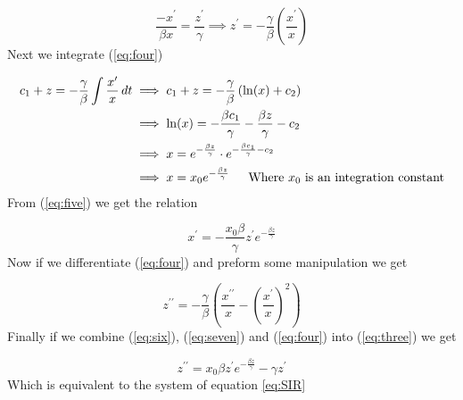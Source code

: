 \begin{equation} \label{eq:four}
	\frac{-x^{\prime}}{\beta x} = \frac{z^{\prime}}{\gamma}
	\implies z^{\prime} = -\frac{\gamma}{\beta}\left(\frac{x^{\prime}}{x}\right)
\end{equation}
\newpage Next we integrate (\ref{eq:four}) 


\begin{equation} \label{eq:five}
	\begin{split}
		c_{1} + z = -\frac{\gamma}{\beta} \int \frac{x^{\prime}}{x} \,dt
		 & \implies c_{1} + z = -\frac{\gamma}{\beta}\left(\ln(x) + c_{2}\right)                                       \\
		 & \implies \ln(x) = -\frac{\beta c_{1}}{\gamma} -\frac{\beta z}{\gamma} - c_{2}                               \\
		 & \implies x = e^{-\frac{\beta z}{\gamma}} \cdot e^{-\frac{\beta c_{1}}{\gamma} - c_{2}}                      \\
		 & \implies x = x_{0}e^{-\frac{\beta z}{\gamma}}  \hspace{\parindent}  \textrm{Where } x_{0} \textrm{ is an integration constant}
	\end{split}
\end{equation}
From (\ref{eq:five}) we get the relation

\begin{equation} \label{eq:six}
	x^{\prime} = -\frac{x_{0}\beta}{\gamma} z^{\prime} e^{-\frac{\beta z}{\gamma}}
\end{equation}
Now if we differentiate (\ref{eq:four}) and preform some manipulation we get

\begin{equation} \label{eq:seven}
	z^{\prime\prime} = -\frac{\gamma}{\beta}\left(\frac{x^{\prime\prime}}{x} - \left(\frac{x^{\prime}}{x}\right)^{2} \right)
\end{equation}
Finally if we combine (\ref{eq:six}), (\ref{eq:seven}) and (\ref{eq:four}) into (\ref{eq:three}) we get

\begin{equation} \label{eq:eight}
	z^{\prime\prime} = x_{0} \beta z^{\prime} e^{-\frac{\beta z}{\gamma}} - \gamma z^{\prime}
\end{equation}
Which is equivalent to the system of equation \ref{eq:SIR} 


